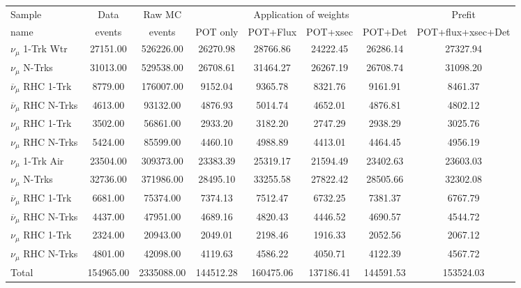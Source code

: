 \begin{tabular}{lccccccc}
\toprule
Sample & Data   & Raw MC & \multicolumn{4}{c}{Application of weights} & Prefit  \\ 
name   & events & events & POT only & POT+Flux  & POT+xsec  & POT+Det &  POT+flux+xsec+Det \\
\midrule
\midrule
$\nu_\mu$ 1-Trk Wtr &  27151.00 &  526226.00 &  26270.98 &  28766.86 &  24222.45 &  26286.14 &  27327.94\\ 
$\nu_\mu$ N-Trks &  31013.00 &  529538.00 &  26708.61 &  31464.27 &  26267.19 &  26708.74 &  31098.20\\ 
$\overline{\nu}_\mu$ RHC 1-Trk &  8779.00 &  176007.00 &  9152.04 &  9365.78 &  8321.76 &  9161.91 &  8461.37\\ 
$\overline{\nu}_\mu$ RHC N-Trks &  4613.00 &  93132.00 &  4876.93 &  5014.74 &  4652.01 &  4876.81 &  4802.12\\ 
$\nu_\mu$ RHC 1-Trk &  3502.00 &  56861.00 &  2933.20 &  3182.20 &  2747.29 &  2938.29 &  3025.76\\ 
$\nu_\mu$ RHC N-Trks &  5424.00 &  85599.00 &  4460.10 &  4988.89 &  4413.01 &  4464.45 &  4956.19\\ 
$\nu_\mu$ 1-Trk Air &  23504.00 &  309373.00 &  23383.39 &  25319.17 &  21594.49 &  23402.63 &  23603.03\\ 
$\nu_\mu$ N-Trks &  32736.00 &  371986.00 &  28495.10 &  33255.58 &  27822.42 &  28505.66 &  32302.08\\ 
$\overline{\nu}_\mu$ RHC 1-Trk &  6681.00 &  75374.00 &  7374.13 &  7512.47 &  6732.25 &  7381.37 &  6767.79\\ 
$\overline{\nu}_\mu$ RHC N-Trks &  4437.00 &  47951.00 &  4689.16 &  4820.43 &  4446.52 &  4690.57 &  4544.72\\ 
$\nu_\mu$ RHC 1-Trk &  2324.00 &  20943.00 &  2049.01 &  2198.46 &  1916.33 &  2052.56 &  2067.12\\ 
$\nu_\mu$ RHC N-Trks &  4801.00 &  42098.00 &  4119.63 &  4586.22 &  4050.71 &  4122.39 &  4567.72\\ 
\midrule
Total &  154965.00 &  2335088.00 &  144512.28 &  160475.06 &  137186.41 &  144591.53 &  153524.03\\
\bottomrule
\end{tabular}
